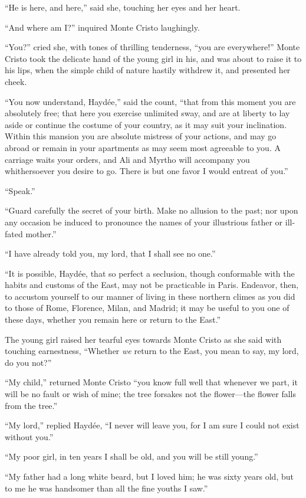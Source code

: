 “He is here, and here,” said she, touching her eyes and her heart.

“And where am I?” inquired Monte Cristo laughingly.

“You?” cried she, with tones of thrilling tenderness, “you are
everywhere!” Monte Cristo took the delicate hand of the young girl in
his, and was about to raise it to his lips, when the simple child of
nature hastily withdrew it, and presented her cheek.

“You now understand, Haydée,” said the count, “that from this moment
you are absolutely free; that here you exercise unlimited sway, and are
at liberty to lay aside or continue the costume of your country, as it
may suit your inclination. Within this mansion you are absolute
mistress of your actions, and may go abroad or remain in your
apartments as may seem most agreeable to you. A carriage waits your
orders, and Ali and Myrtho will accompany you whithersoever you desire
to go. There is but one favor I would entreat of you.”

“Speak.”

“Guard carefully the secret of your birth. Make no allusion to the
past; nor upon any occasion be induced to pronounce the names of your
illustrious father or ill-fated mother.”

“I have already told you, my lord, that I shall see no one.”

“It is possible, Haydée, that so perfect a seclusion, though
conformable with the habits and customs of the East, may not be
practicable in Paris. Endeavor, then, to accustom yourself to our
manner of living in these northern climes as you did to those of Rome,
Florence, Milan, and Madrid; it may be useful to you one of these days,
whether you remain here or return to the East.”

The young girl raised her tearful eyes towards Monte Cristo as she said
with touching earnestness, “Whether \textit{we} return to the East, you mean
to say, my lord, do you not?”

“My child,” returned Monte Cristo “you know full well that whenever we
part, it will be no fault or wish of mine; the tree forsakes not the
flower—the flower falls from the tree.”

“My lord,” replied Haydée, “I never will leave you, for I am sure I
could not exist without you.”

“My poor girl, in ten years I shall be old, and you will be still
young.”

“My father had a long white beard, but I loved him; he was sixty years
old, but to me he was handsomer than all the fine youths I saw.”

